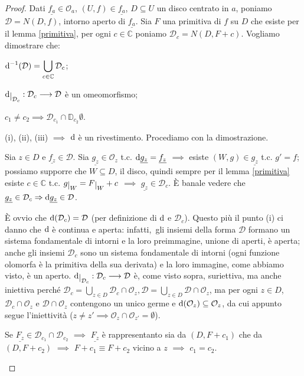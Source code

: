 \begin{proof}
  Dati $\underline{f_a} \in \mathcal{O}_a$, $(U, f) \in \underline{f_a}$, $D \subseteq U$ un disco centrato in $a$, poniamo $\mathcal{D}=N(D, f)$, intorno aperto di $\underline{f_a}$. Sia $F$ una primitiva di $f$ su $D$ che esiste per il lemma \ref{primitiva}, per ogni $c \in \mathbb{C}$ poniamo $\mathcal{D}_c=N(D, F+c)$. Vogliamo dimostrare che:
  \begin{nlist}
    \item $\displaystyle \mathop{}\!\mathrm{d}^{-1}(\mathcal{D})=\bigcup_{c \in \mathbb{C}} \mathcal{D}_c$;
    \item $\diff\restrict{\mathcal{D}_c}:\mathcal{D}_c \longrightarrow \mathcal{D}$ è un omeomorfismo;
    \item $c_1\not=c_2 \implies \mathcal{D}_{c_1} \cap \mathbb{D}_{c_2} \emptyset$.
  \end{nlist}
  (i), (ii), (iii) $\implies$ $\mathop{}\!\mathrm{d}$ è un rivestimento. Procediamo con la dimostrazione.
  \begin{nlist}
    \item Sia $z \in D$ e $\underline{f_z} \in \mathcal{D}$. Sia $\underline{g_z} \in \mathcal{O}_z$ t.c. $\mathop{}\!\mathrm{d}\underline{g_z}=\underline{f_z}$ $\implies$ esiste $(W, g) \in \underline{g_z}$ t.c. $g'=f$;
    possiamo supporre che $W \subseteq D$, il disco, quindi sempre per il lemma \ref{primitiva} esiste $c \in \mathbb{C}$ t.c. $g\restrict{W}=F\restrict{W}+c$ $\implies$ $\underline{g_z} \in \mathcal{D}_c$. È banale vedere che $\underline{g_z} \in \mathcal{D}_c \Rightarrow \mathop{}\!\mathrm{d}\underline{g_z} \in \mathcal{D}$.
    \item È ovvio che $\mathop{}\!\mathrm{d}(\mathcal{D}_c)=\mathcal{D}$ (per definizione di $\mathop{}\!\mathrm{d}$ e $\mathcal{D}_c$). Questo più il punto (i) ci danno che $\mathop{}\!\mathrm{d}$ è continua e aperta: infatti,\ gli insiemi della forma $\mathcal{D}$ formano un sistema fondamentale di intorni e la loro preimmagine, unione di aperti, è aperta; anche gli insiemi $\mathcal{D}_c$ sono un sistema fondamentale di intorni (ogni funzione olomorfa è la primitiva della sua derivata) e la loro immagine, come abbiamo visto, è un aperto.
    $\diff\restrict{\mathcal{D}_c}: \mathcal{D}_c \longrightarrow \mathcal{D}$ è, come visto sopra, suriettiva, ma anche iniettiva perché $\displaystyle \mathcal{D}_c=\bigcup_{z \in D} \mathcal{D}_c \cap \mathcal{O}_z, \mathcal{D}=\bigcup_{z \in D} \mathcal{D} \cap \mathcal{O}_z$,
     ma per ogni $z \in D$, $\mathcal{D}_c\cap \mathcal{O}_z$ e $\mathcal{D}\cap \mathcal{O}_z$ contengono un unico germe e $\mathop{}\!\mathrm{d}(\mathcal{O}_z) \subseteq \mathcal{O}_z$, da cui appunto segue l'iniettività ($z\not=z' \implies \mathcal{O}_z\cap\mathcal{O}_{z'}=\emptyset$).
     \item Se $\underline{F_z} \in \mathcal{D}_{c_1}\cap \mathcal{D}_{c_2}$ $\implies$ $\underline{F_z}$ è rappresentanto sia da $(D, F+c_1)$ che da $(D, F+c_2)$ $\implies$ $F+c_1\equiv F+c_2$ vicino a $z$ $\implies$ $c_1=c_2$.
  \end{nlist}
\end{proof}

